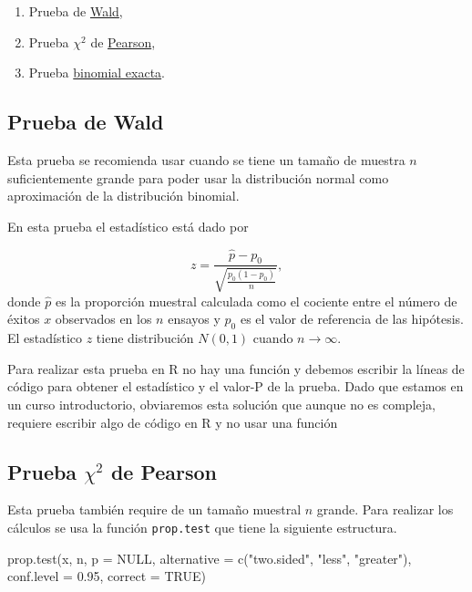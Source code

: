 \documentclass[
]{book}
\newenvironment{Shaded}{\begin{snugshade}}{\end{snugshade}}
\newcommand{\AttributeTok}[1]{\textcolor[rgb]{0.77,0.63,0.00}{#1}}
\newcommand{\ConstantTok}[1]{\textcolor[rgb]{0.00,0.00,0.00}{#1}}
\newcommand{\FloatTok}[1]{\textcolor[rgb]{0.00,0.00,0.81}{#1}}
\newcommand{\FunctionTok}[1]{\textcolor[rgb]{0.00,0.00,0.00}{#1}}
\newcommand{\NormalTok}[1]{#1}
\newcommand{\StringTok}[1]{\textcolor[rgb]{0.31,0.60,0.02}{#1}}
\providecommand{\tightlist}{%
  \setlength{\itemsep}{0pt}\setlength{\parskip}{0pt}}
\begin{document}
\begin{enumerate}
\def\labelenumi{\arabic{enumi}.}
\tightlist
\item
  Prueba de \href{https://en.wikipedia.org/wiki/Wald_test}{Wald},
\item
  Prueba \(\chi^2\) de \href{https://en.wikipedia.org/wiki/Pearson\%27s_chi-squared_test\#Fairness_of_dice}{Pearson},
\item
  Prueba \href{https://en.wikipedia.org/wiki/Binomial_test}{binomial exacta}.
\end{enumerate}

\hypertarget{prueba-de-wald}{%
\subsection{Prueba de Wald}\label{prueba-de-wald}}

Esta prueba se recomienda usar cuando se tiene un tamaño de muestra \(n\) suficientemente grande para poder usar la distribución normal como aproximación de la distribución binomial.

En esta prueba el estadístico está dado por

\[z=\frac{\hat{p}-p_0}{\sqrt{\frac{p_0(1-p_0)}{n}}},\]
donde \(\hat{p}\) es la proporción muestral calculada como el cociente entre el número de éxitos \(x\) observados en los \(n\) ensayos y \(p_0\) es el valor de referencia de las hipótesis. El estadístico \(z\) tiene distribución \(N(0, 1)\) cuando \(n \to \infty\).

Para realizar esta prueba en R no hay una función y debemos escribir la líneas de código para obtener el estadístico y el valor-P de la prueba. Dado que estamos en un curso introductorio, obviaremos esta solución que aunque no es compleja, requiere escribir algo de código en R y no usar una función

\hypertarget{prueba-chi2-de-pearson}{%
\subsection{\texorpdfstring{Prueba \(\chi^2\) de Pearson}{Prueba \textbackslash chi\^{}2 de Pearson}}\label{prueba-chi2-de-pearson}}

Esta prueba también require de un tamaño muestral \(n\) grande. Para realizar los cálculos se usa la función \texttt{prop.test} que tiene la siguiente estructura.

\begin{Shaded}
\begin{Highlighting}[]
\FunctionTok{prop.test}\NormalTok{(x, n, }\AttributeTok{p =} \ConstantTok{NULL}\NormalTok{,}
          \AttributeTok{alternative =} \FunctionTok{c}\NormalTok{(}\StringTok{"two.sided"}\NormalTok{, }\StringTok{"less"}\NormalTok{, }\StringTok{"greater"}\NormalTok{),}
          \AttributeTok{conf.level =} \FloatTok{0.95}\NormalTok{, }\AttributeTok{correct =} \ConstantTok{TRUE}\NormalTok{)}
\end{Highlighting}
\end{Shaded}
\end{document}
